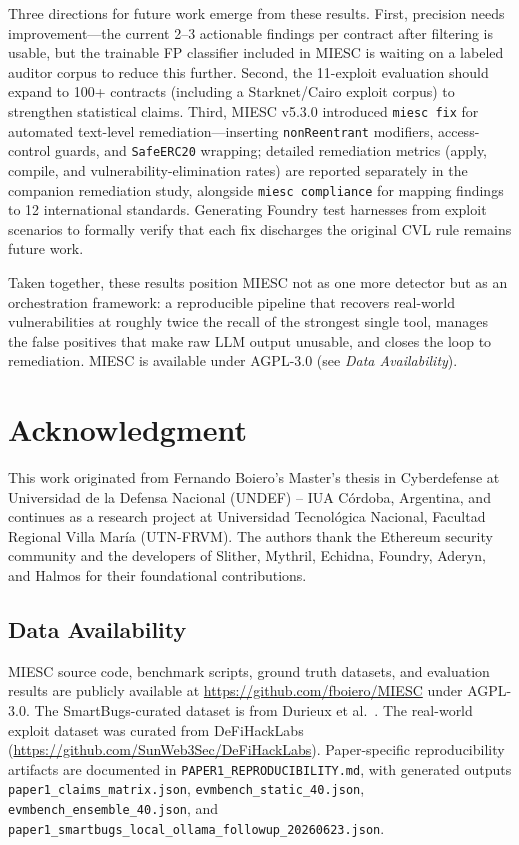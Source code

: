 \documentclass[conference]{IEEEtran}
\begin{document}
Three directions for future work emerge from these results. First, precision needs improvement---the current 2--3 actionable findings per contract after filtering is usable, but the trainable FP classifier included in MIESC is waiting on a labeled auditor corpus to reduce this further. Second, the 11-exploit evaluation should expand to 100+ contracts (including a Starknet/Cairo exploit corpus) to strengthen statistical claims. Third, MIESC v5.3.0 introduced \texttt{miesc fix} for automated text-level remediation---inserting \texttt{nonReentrant} modifiers, access-control guards, and \texttt{SafeERC20} wrapping; detailed remediation metrics (apply, compile, and vulnerability-elimination rates) are reported separately in the companion remediation study, alongside \texttt{miesc compliance} for mapping findings to 12 international standards. Generating Foundry test harnesses from exploit scenarios to formally verify that each fix discharges the original CVL rule remains future work.

Taken together, these results position MIESC not as one more detector but as an orchestration framework: a reproducible pipeline that recovers real-world vulnerabilities at roughly twice the recall of the strongest single tool, manages the false positives that make raw LLM output unusable, and closes the loop to remediation. MIESC is available under AGPL-3.0 (see \emph{Data Availability}).

\section*{Acknowledgment}

This work originated from Fernando Boiero's Master's thesis in Cyberdefense at Universidad de la Defensa Nacional (UNDEF) -- IUA C\'ordoba, Argentina, and continues as a research project at Universidad Tecnol\'ogica Nacional, Facultad Regional Villa Mar\'ia (UTN-FRVM). The authors thank the Ethereum security community and the developers of Slither, Mythril, Echidna, Foundry, Aderyn, and Halmos for their foundational contributions.

\subsection*{Data Availability}

MIESC source code, benchmark scripts, ground truth datasets, and evaluation results are publicly available at \url{https://github.com/fboiero/MIESC} under AGPL-3.0. The SmartBugs-curated dataset is from Durieux et al.~\cite{durieux2020empirical}. The real-world exploit dataset was curated from DeFiHackLabs (\url{https://github.com/SunWeb3Sec/DeFiHackLabs}). Paper-specific reproducibility artifacts are documented in \texttt{PAPER1\_REPRODUCIBILITY.md}, with generated outputs \texttt{paper1\_claims\_matrix.json}, \texttt{evmbench\_static\_40.json}, \texttt{evmbench\_ensemble\_40.json}, and \texttt{paper1\_smartbugs\_local\_ollama\_followup\_20260623.json}.



\end{document}
